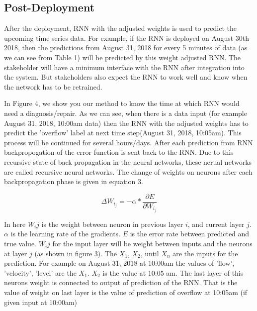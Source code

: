 \documentclass[sigconf,authordraft]{acmart}
\begin{document}
\subsection{Post-Deployment}
After the deployment, RNN with the adjusted weights is used to predict the upcoming time series data. For example, if the RNN is deployed on August 30th 2018, then the predictions from August 31, 2018 for every 5 minutes of data (as we can see from Table 1) will be predicted by this weight adjusted RNN. The stakeholder will have a minimum interface with the RNN after integration into the system. But stakeholders also expect the RNN to work well and know when the network has to be retrained.

In Figure 4, we show you our method to know the time at which RNN would need a diagnosis/repair.  As we can see, when there is a data input (for example August 31, 2018, 10:00am data) then the RNN with the adjusted weights has to predict the 'overflow' label at next time step(August 31, 2018, 10:05am). This process will be continued for several hours/days. After each prediction from RNN backpropogation of the error function is sent back to the RNN. Due to this recursive state of back propagation in the neural networks, these nerual networks are called recursive neural networks. The change of weights on neurons after each backpropagation phase is given in equation 3.

\begin{equation}
  \Delta{W_i_j} = - \alpha*\frac{\partial E}{\partial W_i_j}
\end{equation}

In here $W_ij$ is the weight between neuron in previous layer $i$, and current layer $j$. $\alpha$ is the learning rate of the gradients. $E$ is the error rate between predicted and true value. $W_ij$ for the input layer will be weight between inputs and the neurons at layer $j$ (as shown in figure 3). The $X_1$, $X_2$, until $X_n$ are the inputs for the prediction. For example on August 31, 2018 at 10:00am the values of 'flow', 'velocity', 'level'  are the $X_1$. $X_2$ is the value at 10:05 am. The last layer of this neurons weight is connected to output of prediction of the RNN. That is the value of weight on last layer is the value of prediction of overflow at 10:05am (if given input at 10:00am)
\end{document}
